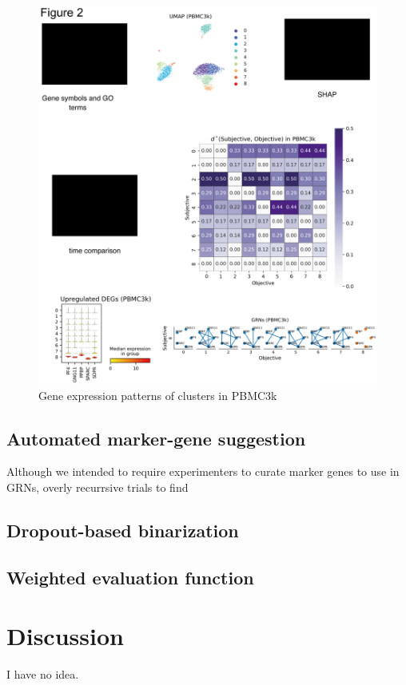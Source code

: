 \documentclass{article}
\begin{document}
\begin{figure}[htb]
  \centering
  \includegraphics[scale=0.8]{./figs/exported/figure_2.png}
  \caption{Gene expression patterns of clusters in PBMC3k}
  \label{bc}
\end{figure}


\subsection*{Automated marker-gene suggestion}
Although we intended to require experimenters to curate marker genes to use
in GRNs, overly recurrsive trials to find 

\subsection*{Dropout-based binarization}
\subsection*{Weighted evaluation function}

\section*{Discussion}
I have no idea.
\end{document}
